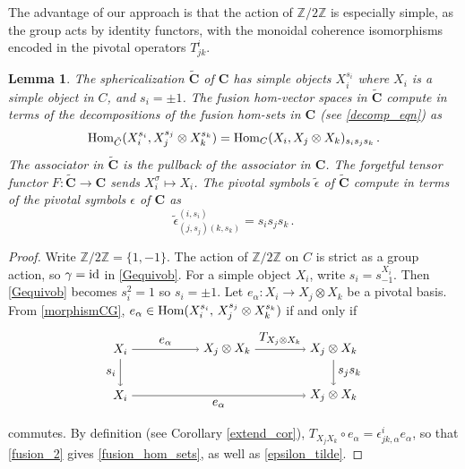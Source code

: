 \documentclass[a4paper]{article}
\theoremstyle{plain}
\newtheorem{lem}[thm]{Lemma}
\theoremstyle{definition}
\newenvironment{tz}[1][]{\begin{aligned}\begin{tikzpicture}[#1]}{\end{tikzpicture}\end{aligned}}
\newcommand\id{\operatorname{\text{\rm id}}}
\newcommand{\Hom}{\operatorname{\text{\rm Hom}}}
\newcommand{\cat}{\mathbf}
\begin{document}
The advantage of our approach is that the action of $\mathbb{Z} / 2 \mathbb{Z}$ is especially simple, as the group acts by identity functors, with the monoidal coherence isomorphisms encoded in the pivotal operators $T^i_{jk}$. 



\begin{lem} The sphericalization $\tilde{\cat{C}}$ of $\cat{C}$ has simple objects $X_i^{s_i}$ where $X_i$ is a simple object in $C$, and $s_i = \pm 1$. The fusion hom-vector spaces in $\tilde{\cat{C}}$ compute in terms of the decompositions of the fusion hom-sets in $\cat{C}$ (see \eqref{decomp_eqn}) as
\begin{equation} \label{fusion_hom_sets}
 \Hom_{\tilde{C}} (X_i^{s_i}, X_j^{s_j} \otimes X_k^{s_k}) = \Hom_C (X_i, X_j \otimes X_k)_{s_i s_j s_k} \, .
\end{equation}
The associator in $\tilde{\cat{C}}$ is the pullback of the associator in $\cat{C}$. The  forgetful tensor functor $F : \tilde{\cat{C}} \rightarrow \cat{C}$ sends $X_i^\sigma \mapsto X_i$. The pivotal symbols $\tilde{\epsilon}$ of $\tilde{\cat{C}}$ compute in terms of the pivotal symbols $\epsilon$ of $\cat{C}$ as 
\begin{equation} \label{epsilon_tilde}
 \tilde{\epsilon}^{(i, s_i)}_{(j, s_j) (k, s_k)} = s_i s_j s_k \, .
\end{equation}
\end{lem}
\begin{proof} Write $\mathbb{Z} / 2 \mathbb{Z} = \{1, -1\}$. The action of $\mathbb{Z}/2\mathbb{Z}$ on $C$ is strict as a group action, so $\gamma=\id$ in \eqref{Gequivob}. For a simple object $X_i$, write $s_i = s^{X_i}_{-1}$. Then \eqref{Gequivob} becomes $s_i^2 = 1$ so $s_i = \pm 1$. Let $e_\alpha : X_i \rightarrow X_j \otimes X_k$ be a pivotal basis. From \eqref{morphismCG}, $e_\alpha \in \Hom(X_i^{s_i}, \, X_j^{s_j} \otimes X_k^{s_k})$ if and only if 
\begin{equation} \label{fusion_2}
\begin{tz}[xscale=3, yscale=1.3]
 \node (1) at (0,0) {$X_i$};
 \node (2) at (1,0) {$X_j \otimes X_k$};
 \node (3) at (2,0) {$X_j \otimes X_k$};
 \node (4) at (2,-1) {$X_j \otimes X_k$};
 \node (5) at (0,-1) {$X_i$};
 \draw[->] (1) -- node[above]{$e_\alpha$} (2);
 \draw[->] (2) -- node[above]{$T_{X_j\otimes X_k}$} (3);
 \draw[->] (3) -- node[right]{$s_j s_k$} (4);
 \draw[->] (1) -- node[left]{$s_i$} (5);
 \draw[->] (5) -- node[below]{$e_\alpha$} (4);
\end{tz}
\end{equation}
commutes. By definition (see Corollary \ref{extend_cor}), $T_{X_j X_k} \circ e_\alpha = \epsilon^i_{jk, \alpha} e_\alpha$, so that \eqref{fusion_2} gives \eqref{fusion_hom_sets}, as well as \eqref{epsilon_tilde}.
\end{proof}
\end{document}
